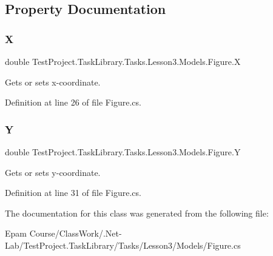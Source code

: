 \subsection{Property Documentation}
\mbox{\label{class_test_project_1_1_task_library_1_1_tasks_1_1_lesson3_1_1_models_1_1_figure_ae98f10773be1e0fd538ac8f8d9d73abb}} 
\subsubsection{\texorpdfstring{X}{X}}
{\footnotesize\ttfamily double Test\+Project.\+Task\+Library.\+Tasks.\+Lesson3.\+Models.\+Figure.\+X\hspace{0.3cm}{\ttfamily [get]}}



Gets or sets x-\/coordinate. 



Definition at line 26 of file Figure.\+cs.

\mbox{\label{class_test_project_1_1_task_library_1_1_tasks_1_1_lesson3_1_1_models_1_1_figure_acfdf6e90e96eedf8d0d200cc6e14b071}} 
\subsubsection{\texorpdfstring{Y}{Y}}
{\footnotesize\ttfamily double Test\+Project.\+Task\+Library.\+Tasks.\+Lesson3.\+Models.\+Figure.\+Y\hspace{0.3cm}{\ttfamily [get]}}



Gets or sets y-\/coordinate. 



Definition at line 31 of file Figure.\+cs.



The documentation for this class was generated from the following file\+:\begin{DoxyCompactItemize}
\item 
Epam Course/\+Class\+Work/.\+Net-\/\+Lab/\+Test\+Project.\+Task\+Library/\+Tasks/\+Lesson3/\+Models/Figure.\+cs\end{DoxyCompactItemize}
